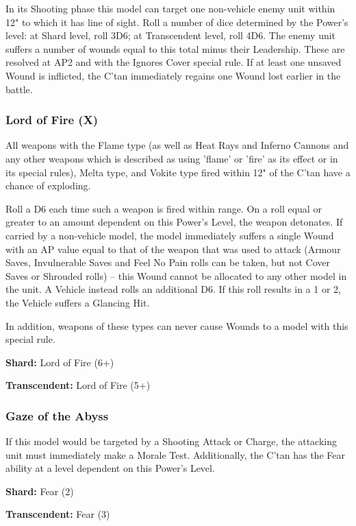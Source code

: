 In its Shooting phase this model can target one non-vehicle enemy unit within 12" to which it has line of sight. Roll a number of dice determined by the Power's level: at Shard level, roll 3D6; at Transcendent level, roll 4D6. The enemy unit suffers a number of wounds equal to this total minus their Leadership. These are resolved at AP2 and with the Ignores Cover special rule. If at least one unsaved Wound is inflicted, the C’tan immediately regains one Wound lost earlier in the battle.

\subsubsection{Lord of Fire (X)} \label{Lord of Fire}

All weapons with the Flame type (as well as Heat Rays and Inferno Cannons and any other weapons which is described as using 'flame' or 'fire' as its effect or in its special rules), Melta type, and Vokite type fired within 12" of the C'tan have a chance of exploding. 

Roll a D6 each time such a weapon is fired within range. On a roll equal or greater to an amount dependent on this Power's Level, the weapon detonates. If carried by a non-vehicle model, the model immediately suffers a single Wound with an AP value equal to that of the weapon that was used to attack (Armour Saves, Invulnerable Saves and Feel No Pain rolls can be taken, but not Cover Saves or Shrouded rolls) – this Wound cannot be allocated to any other model in the unit. A Vehicle instead rolls an additional D6. If this roll results in a 1 or 2, the Vehicle suffers a Glancing Hit.

In addition, weapons of these types can never cause Wounds to a model with this special rule.

\textbf{Shard:} Lord of Fire (6+)

\textbf{Transcendent:} Lord of Fire (5+)


\subsubsection{Gaze of the Abyss} \label{Gaze of the Abyss}

If this model would be targeted by a Shooting Attack or Charge, the attacking unit must immediately make a Morale Test. Additionally, the C'tan has the Fear ability at a level dependent on this Power's Level.

\textbf{Shard:} Fear (2)

\textbf{Transcendent:} Fear (3)


